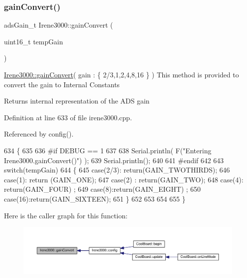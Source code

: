 \subsubsection{\texorpdfstring{gain\+Convert()}{gainConvert()}}
{\footnotesize\ttfamily ads\+Gain\+\_\+t Irene3000\+::gain\+Convert (\begin{DoxyParamCaption}\item[{uint16\+\_\+t}]{temp\+Gain }\end{DoxyParamCaption})}

\hyperlink{classIrene3000_abcad62d1201a59f8dd3ba87048002728}{Irene3000\+::gain\+Convert}( gain \+: \{ 2/3,1,2,4,8,16 \} ) This method is provided to convert the gain to Internal Constants

\begin{DoxyReturn}{Returns}
internal representation of the A\+DS gain 
\end{DoxyReturn}


Definition at line 633 of file irene3000.\+cpp.



Referenced by config().


\begin{DoxyCode}
634 \{
635 
636 \textcolor{preprocessor}{#if DEBUG == 1 }
637 
638     Serial.println( F(\textcolor{stringliteral}{"Entering Irene3000.gainConvert()"}) );
639     Serial.println();
640 
641 \textcolor{preprocessor}{#endif }
642     
643     \textcolor{keywordflow}{switch}(tempGain)
644     \{
645         \textcolor{keywordflow}{case}(2/3): \textcolor{keywordflow}{return}(GAIN\_TWOTHIRDS);
646         \textcolor{keywordflow}{case}(1): \textcolor{keywordflow}{return} (GAIN\_ONE);
647         \textcolor{keywordflow}{case}(2) : \textcolor{keywordflow}{return}(GAIN\_TWO);
648         \textcolor{keywordflow}{case}(4): \textcolor{keywordflow}{return}(GAIN\_FOUR) ;   
649         \textcolor{keywordflow}{case}(8):\textcolor{keywordflow}{return}(GAIN\_EIGHT)  ;  
650         \textcolor{keywordflow}{case}(16):\textcolor{keywordflow}{return}(GAIN\_SIXTEEN);  
651     \}
652 
653 
654 
655 \}
\end{DoxyCode}
Here is the caller graph for this function\+:
\nopagebreak
\begin{figure}[H]
\begin{center}
\leavevmode
\includegraphics[width=350pt]{classIrene3000_abcad62d1201a59f8dd3ba87048002728_icgraph}
\end{center}
\end{figure}
\mbox{\label{classIrene3000_a7bc2414100b5e19eacc6630fa34b2654}} 
